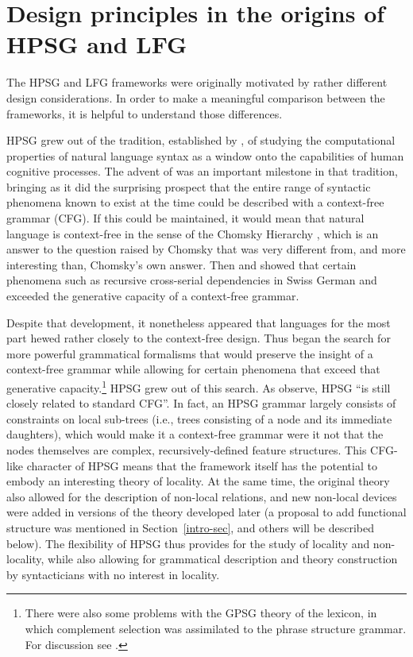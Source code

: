 \section{Design principles in the origins of HPSG and LFG} 
\label{design-sec}
The HPSG and LFG  frameworks were originally motivated by rather different design considerations.  In order to make a meaningful comparison between the frameworks, it is helpful to understand those differences.  

HPSG grew out of the tradition, established by \citet{Chomsky57a}, of studying the computational properties of natural language syntax as a window onto the capabilities of human cognitive processes.  The advent of  \citep{GKPS85a} was an important milestone in that tradition, bringing as it did the surprising prospect that the entire range of syntactic phenomena known to exist at the time could be described with a context-free grammar (CFG).  If this could be maintained, it would mean that natural language is context-free in the sense of the Chomsky Hierarchy \citep{Chomsky57a}, which is an answer to the question raised by Chomsky that was very different from, and more interesting than, Chomsky's own answer.  Then  \citet{Shieber85a} and \citet{Culy85a} showed that certain phenomena such as recursive cross-serial dependencies in Swiss German and  exceeded the generative capacity of a context-free grammar.   


Despite that development, it nonetheless appeared that languages for the most part hewed rather closely to the context-free design.  Thus began the search for more powerful grammatical formalisms that would preserve the insight of a context-free grammar while allowing for certain phenomena that exceed that generative capacity.\footnote{There were also some problems with the GPSG theory of the lexicon, in which complement selection was assimilated to the phrase structure grammar.  For discussion see \citet[Section~4.1]{MWArgSt}.}  HPSG grew out of this search. As  \citet[83]{SWB2003a} observe, HPSG ``is still  closely related to standard CFG''.  In fact, an HPSG grammar largely consists of constraints on local sub-trees (i.e., trees consisting of a node and its immediate daughters), which would make it a context-free grammar were it not that the nodes themselves are complex, recursively-defined feature structures.   This CFG-like character of HPSG means that the framework itself has the potential to embody an interesting theory of locality.   At the same time, the original theory also allowed for the description of non-local relations, and new non-local devices were added in versions of the theory developed later (a proposal to add functional structure was mentioned in Section~\ref{intro-sec}, and others will be described below).  The flexibility of HPSG thus provides for the study of locality and non-locality, while also allowing for grammatical description and theory construction by syntacticians with no interest in locality.  


